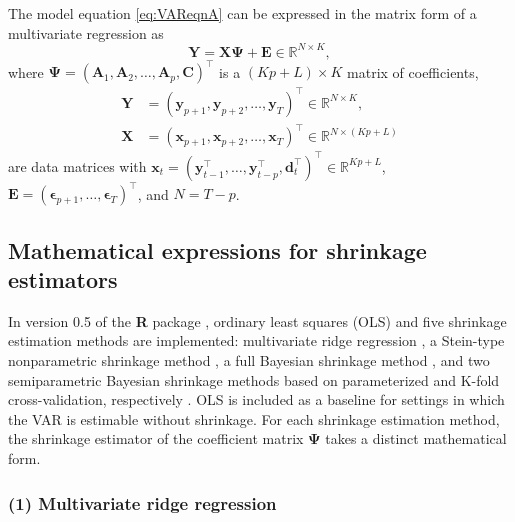 The model equation \eqref{eq:VAReqnA} can be expressed in the
matrix form of a multivariate regression as
\begin{equation}
    \mathbf{Y} = \mathbf{X} \boldsymbol\Psi + \mathbf{E} \in \mathbb{R}^{N \times K},
    \label{eq:VAReqnMat}
\end{equation}
where
\(\boldsymbol\Psi = (\mathbf{A}_1, \mathbf{A}_2, \ldots, \mathbf{A}_p, \mathbf{C})^\top\)
is a \((Kp + L) \times K\) matrix of coefficients,
\begin{equation}
    \begin{split}
    \mathbf{Y} &= ( \mathbf{y}_{p+1}, \mathbf{y}_{p+2}, \ldots, \mathbf{y}_{T} )^\top \in \mathbb{R}^{N \times K},
    \\
    \mathbf{X} &= ( \mathbf{x}_{p+1}, \mathbf{x}_{p+2}, \ldots, \mathbf{x}_{T} )^\top \in \mathbb{R}^{N \times (Kp + L)}
    \end{split}
\end{equation}
are data matrices with
\(\mathbf{x}_t = (\mathbf{y}_{t-1}^\top, \ldots, \mathbf{y}_{t-p}^\top, \mathbf{d}_t^\top)^\top \in \mathbb{R}^{Kp + L}\),
\(\mathbf{E} = (\boldsymbol\epsilon_{p+1}, \ldots, \boldsymbol\epsilon_T)^\top\),
and \(N = T-p\).

\subsection{Mathematical expressions for shrinkage estimators}\label{mathematical-expressions-for-shrinkage-estimators}

In version 0.5 of the \textbf{R} package , ordinary
least squares (OLS) and five shrinkage estimation methods are
implemented: multivariate ridge regression \citep{Hoerl70, Golub79, Ripley18},
a Stein-type nonparametric shrinkage method \citep{Schafer05b, Rhein07c, Schafer17},
a full Bayesian shrinkage method \citep{Sun04, Ni05}, and two semiparametric
Bayesian shrinkage methods based on parameterized and K-fold
cross-validation, respectively \citep{LeeChoiKim2016}. OLS is included as a
baseline for settings in which the VAR is estimable without shrinkage.
For each shrinkage estimation method, the shrinkage estimator of the
coefficient matrix \(\boldsymbol\Psi\) takes a distinct mathematical form.

\subsubsection{(1) Multivariate ridge regression}\label{multivariate-ridge-regression}

